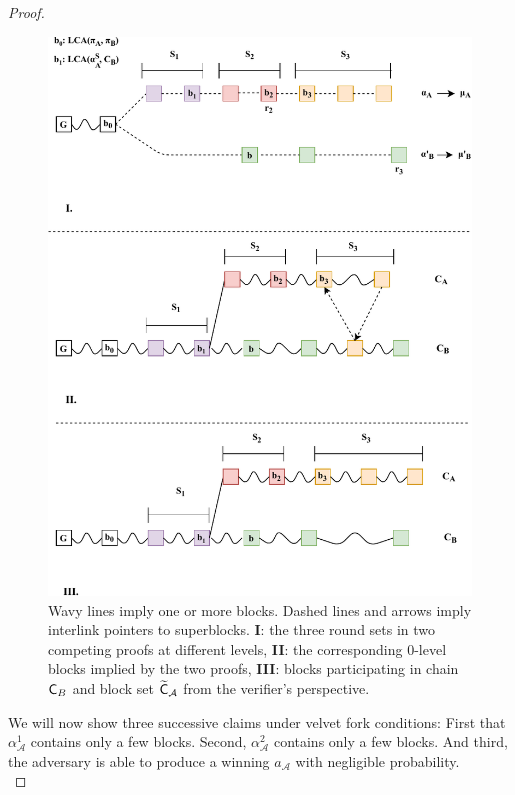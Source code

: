 \begin{proof}
\begin{figure}[h!]
	\begin{center}
    \includegraphics[width=\columnwidth]{figures/proof_velvet-crop.pdf}
	\end{center}
	\caption{Wavy lines imply one or more blocks. Dashed lines and arrows imply interlink pointers to superblocks. \textbf{I}: the three round sets in two competing proofs at different levels, \textbf{II}: the corresponding 0-level blocks implied by the two proofs, \textbf{III}: blocks participating in chain $\mathsf{C}_B$ and block set $\widetilde{\mathsf{C}}_\mathcal{A}$ from the verifier's perspective.}
    \label{fig:proof_velvet}
\end{figure}

We will now show three successive claims under velvet fork conditions: First that $\alpha_\mathcal{A}^1$ contains only a few blocks. Second,  $\alpha_\mathcal{A}^2$ contains only a few blocks. And third, the adversary is able to produce a winning $a_\mathcal{A}$ with negligible probability.\\


\end{proof}
